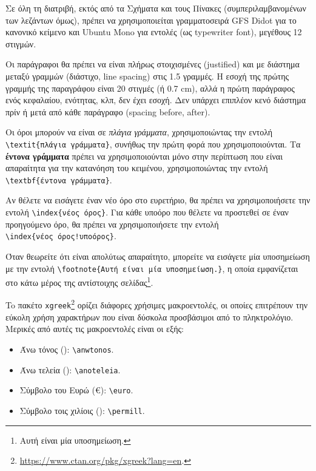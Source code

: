 Σε όλη τη διατριβή, εκτός από τα Σχήματα και τους Πίνακες (συμπεριλαμβανομένων των λεζάντων όμως), πρέπει να χρησιμοποιείται γραμματοσειρά GFS Didot για το κανονικό κείμενο και Ubuntu Mono για εντολές (ως typewriter font), μεγέθους 12 στιγμών.

Οι παράγραφοι θα πρέπει να είναι πλήρως στοιχισμένες (justified) και με διάστημα μεταξύ γραμμών (διάστιχο, line spacing) στις 1.5 γραμμές. %
Η εσοχή της πρώτης γραμμής της παραγράφου είναι 20 στιγμές (ή 0.7 cm), αλλά η πρώτη παράγραφος ενός κεφαλαίου, ενότητας, κλπ, δεν έχει εσοχή.
Δεν υπάρχει επιπλέον κενό διάστημα πρίν ή μετά από κάθε παράγραφο (spacing before, after).

Οι όροι μπορούν να είναι σε \textit{πλάγια γράμματα}, 
χρησιμοποιώντας την εντολή \verb|\textit{πλάγια γράμματα}|, συνήθως την 
πρώτη φορά που χρησιμοποιούνται. Τα \textbf{έντο\-να γράμματα} πρέπει να 
χρησιμοποιούνται μόνο στην περίπτωση που είναι απαραίτητα για την κατανόηση 
του κειμένου, χρησιμοποιώντας την εντολή\\
\verb|\textbf{έντονα γράμματα}|.

Αν θέλετε να εισάγετε έναν νέο όρο στο ευρετήριο, θα πρέπει να χρησιμοποιήσετε 
την εντολή \verb|\index{νέος όρος}|. Για κάθε υποόρο που 
θέλετε να προστεθεί σε έναν προηγούμενο όρο, θα πρέπει να χρησιμοποιήσετε την 
εντολή\\
\verb|\index{νέος όρος!υποόρος}|.

Όταν θεωρείτε ότι είναι απολύτως απαραίτητο, μπορείτε να εισάγετε μία 
υποσημείωση με την εντολή \verb|\footnote{Αυτή είναι μία υποσημείωση.}|, 
η οποία εμφανίζεται στο κάτω μέρος της αντίστοιχης 
σελίδας\footnote{Αυτή είναι μία υποσημείωση.}.

To πακέτο \texttt{xgreek}\footnote{\url{https://www.ctan.org/pkg/xgreek?lang=en}.} 
ορίζει διάφορες χρήσιμες μακροεντολές, οι οποίες επιτρέπουν την εύκολη χρήση 
χαρακτήρων που είναι δύσκολα προσβάσιμοι από το πληκτρολόγιο.
Μερικές από αυτές τις μακροεντολές είναι οι εξής:
\begin{itemize}
	\item Άνω τόνος (\anwtonos): \verb|\anwtonos|.
	\item Άνω τελεία (\anoteleia): \verb|\anoteleia|.
	\item Σύμβολο του Ευρώ (\euro): \verb|\euro|.
	\item Σύμβολο τοις χιλίοις (\permill): \verb|\permill|.
\end{itemize}

